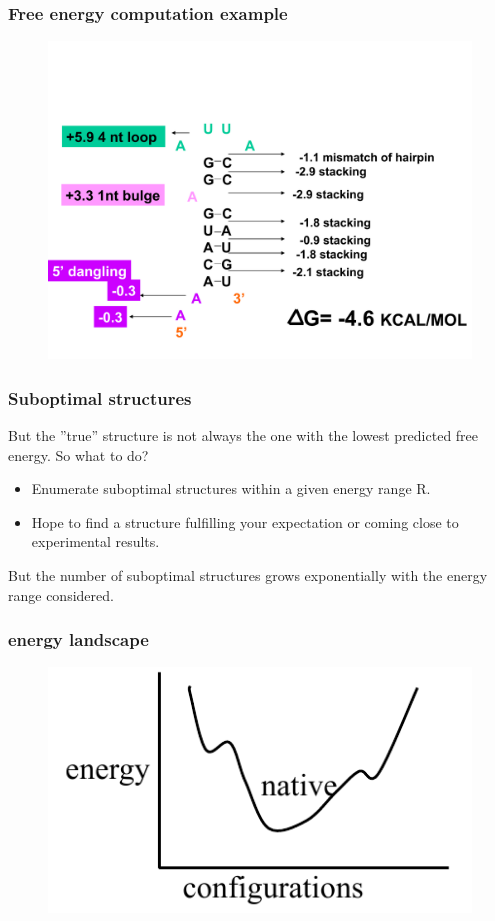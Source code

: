 \documentclass[ignorenonframetext,10pt]{beamer}
\begin{document}
\begin{frame}
\frametitle{Free energy computation example}  
\begin{figure}
  \includegraphics[scale=0.4]{images/mfe_example.pdf} 
\end{figure}
\end{frame}


\begin{frame}
\frametitle{Suboptimal structures}
    But the ''true'' structure is not always the one with the lowest
    predicted free energy.
    So what to do?
    \begin{itemize} 
    \item Enumerate suboptimal structures within a given energy range R.
    \item Hope to find a structure fulfilling your expectation or coming close
    to experimental results.
    \end{itemize}
    But the number of suboptimal structures grows exponentially with the energy
    range considered.
\end{frame}

\begin{frame}
\frametitle{energy landscape}  
\begin{figure}
  \includegraphics[scale=0.4]{images/energy_landscape_simple.jpg} 
\end{figure}
\end{frame}
\end{document}
